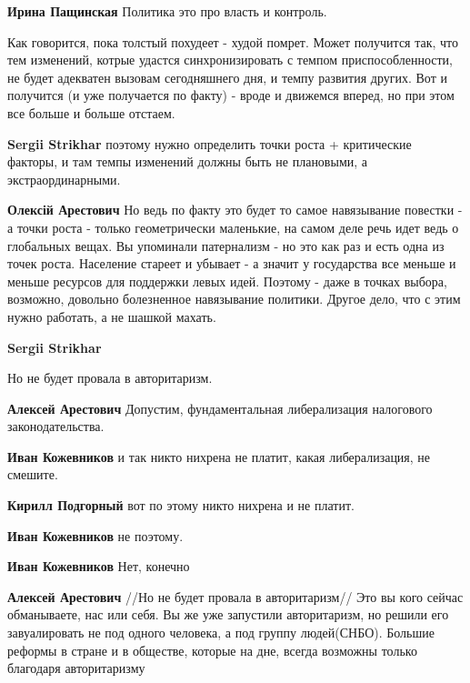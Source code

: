 \begin{itemize}
\textbf{Ирина Пащинская} Политика это про власть и контроль.


Как говорится, пока толстый похудеет - худой помрет. Может получится так, что
тем изменений, котрые удастся синхронизировать с темпом приспособленности, не
будет адекватен вызовам сегодняшнего дня, и темпу развития других. Вот и
получится (и уже получается по факту) - вроде и движемся вперед, но при этом
все больше и больше отстаем.


\textbf{Sergii Strikhar} поэтому нужно определить точки роста + критические
факторы, и там темпы изменений должны быть не плановыми, а экстраординарными.


\textbf{Олексій Арестович} Но ведь по факту это будет то самое навязывание
повестки - а точки роста - только геометрически маленькие, на самом деле речь
идет ведь о глобальных вещах. Вы упоминали патернализм - но это как раз и есть
одна из точек роста. Население стареет и убывает - а значит у государства все
меньше и меньше ресурсов для поддержки левых идей. Поэтому - даже в точках
выбора, возможно, довольно болезненное навязывание политики. Другое дело, что с
этим нужно работать, а не шашкой махать.

\textbf{Sergii Strikhar}

Но не будет провала в авторитаризм.


\textbf{Алексей Арестович} Допустим, фундаментальная либерализация налогового
законодательства.


\textbf{Иван Кожевников} и так никто нихрена не платит, какая либерализация, не смешите.


\textbf{Кирилл Подгорный} вот по этому никто нихрена и не платит.

\textbf{Иван Кожевников} не поэтому.

\textbf{Иван Кожевников} Нет, конечно


\textbf{Алексей Арестович} //Но не будет провала в авторитаризм// Это вы кого
сейчас обманываете, нас или себя. Вы же уже запустили авторитаризм, но решили
его завуалировать не под одного человека, а под группу людей(СНБО).  Большие
реформы в стране и в обществе, которые на дне, всегда возможны только благодаря
авторитаризму


\end{itemize}
